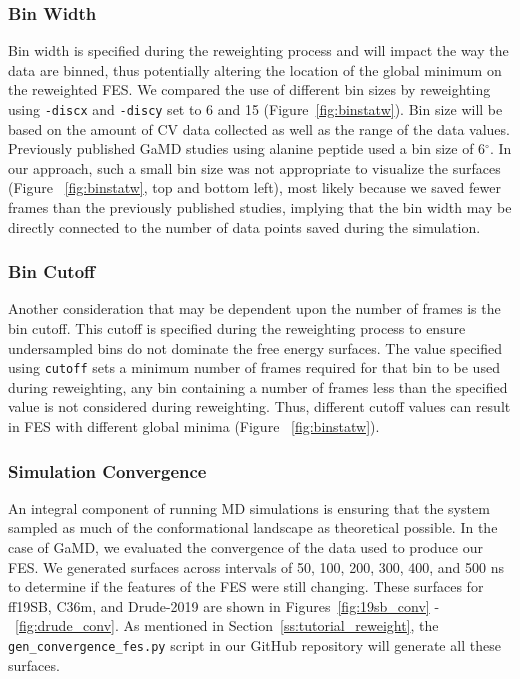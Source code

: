 \documentclass[9pt,tutorial]{livecoms}
\begin{document}
\subsubsection{Bin Width} 
Bin width is specified during the reweighting process and will impact the way the data are binned, thus potentially altering the location of the global minimum on the reweighted FES. We compared the use of different bin sizes by reweighting using \texttt{-discx} and \texttt{-discy} set to 6 and 15 (Figure~\ref{fig:binstatw}). Bin size will be based on the amount of CV data collected as well as the range of the data values. Previously published GaMD studies using alanine peptide used a bin size of 6$^{\circ}$.\cite{miao_gaussian_2015} In our approach, such a small bin size was not appropriate to visualize the surfaces (Figure ~\ref{fig:binstatw}, top and bottom left), most likely because we saved fewer frames than the previously published studies, implying that the bin width may be directly connected to the number of data points saved during the simulation.

\subsubsection{Bin Cutoff}
Another consideration that may be dependent upon the number of frames is the bin cutoff. This cutoff is specified during the reweighting process to ensure undersampled bins do not dominate the free energy surfaces. The value specified using \texttt{cutoff} sets a minimum number of frames required for that bin to be used during reweighting, any bin containing a number of frames less than the specified value is not considered during reweighting. Thus, different cutoff values can result in FES with different global minima (Figure ~\ref{fig:binstatw}).

\subsubsection{Simulation Convergence} 
An integral component of running MD simulations is ensuring that the system sampled as much of the conformational landscape as theoretical possible. In the case of GaMD, we evaluated the convergence of the data used to produce our FES. We generated surfaces across intervals of 50, 100, 200, 300, 400, and 500 ns to determine if the features of the FES were still changing. These surfaces for ff19SB, C36m, and Drude-2019 are shown in Figures~\ref{fig:19sb_conv} -~\ref{fig:drude_conv}. As mentioned in Section~\ref{ss:tutorial_reweight}, the \texttt{gen\_convergence\_fes.py} script in our GitHub repository will generate all these surfaces.
\end{document}
